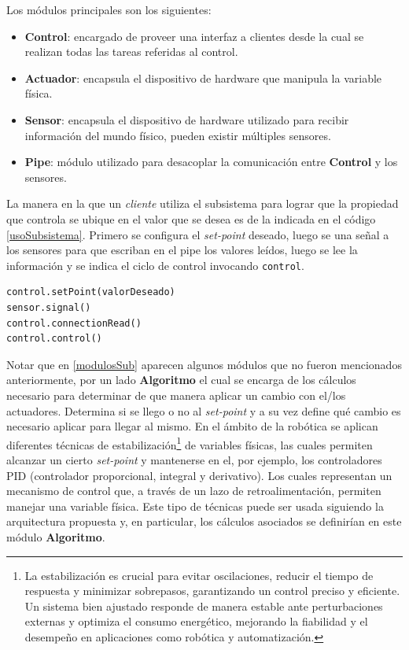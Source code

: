 Los módulos principales son los siguientes:

\begin{itemize}
\item \textbf{Control}: encargado de proveer una interfaz a clientes desde la cual se realizan todas las tareas referidas al control.
\item \textbf{Actuador}: encapsula el dispositivo de hardware que manipula la variable física.
\item \textbf{Sensor}: encapsula el dispositivo de hardware utilizado para recibir información del mundo físico, pueden existir múltiples sensores.
\item \textbf{Pipe}: módulo utilizado para desacoplar la comunicación entre \textbf{Control} y los sensores.
\end{itemize}


La manera en la que un \textit{cliente} utiliza el subsistema para lograr que la propiedad que controla se ubique en el valor que se desea es de la indicada en el código \ref{usoSubsistema}. Primero se configura el \textit{set-point} deseado, luego se  una señal a los sensores para que escriban en el pipe los valores leídos, luego se lee la información y se indica el ciclo de control invocando \verb|control|.

\begin{lstlisting}[caption=Ejemplo de uso del subsistema.,label={usoSubsistema},style=seudocode]
control.setPoint(valorDeseado)
sensor.signal()
control.connectionRead()
control.control()
\end{lstlisting}

Notar que en \ref{modulosSub} aparecen algunos módulos que no fueron mencionados anteriormente, por un lado \textbf{Algoritmo} el cual se encarga de los cálculos necesario para determinar de que manera aplicar un cambio con el/los actuadores. Determina si se llego o no al \textit{set-point} y a su vez define qué cambio es necesario aplicar para llegar al mismo. En el ámbito de la robótica se aplican diferentes técnicas de estabilización\footnote{La estabilización es crucial para evitar oscilaciones, reducir el tiempo de respuesta y minimizar sobrepasos, garantizando un control preciso y eficiente. Un sistema bien ajustado responde de manera estable ante perturbaciones externas y optimiza el consumo energético, mejorando la fiabilidad y el desempeño en aplicaciones como robótica y automatización.} de variables físicas, las cuales permiten alcanzar un cierto \textit{set-point} y mantenerse en el, por ejemplo, los controladores \gls{PID}\cite{pidlibro} (controlador proporcional, integral y derivativo). Los cuales representan un mecanismo de control que, a través de un lazo de retroalimentación, permiten manejar una variable física. Este tipo de técnicas puede ser usada siguiendo la arquitectura propuesta y, en particular, los cálculos asociados se definirían en este módulo \textbf{Algoritmo}.

